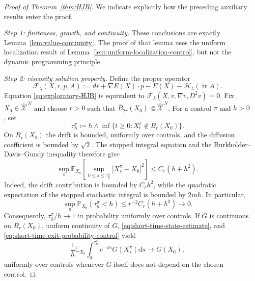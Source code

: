 \documentclass[11pt]{article}
\def\E{\mathbb{E}}
\def\P{\mathbb{P}}
\def\Fc{{\mathcal F}}
\def\Xc{{\mathcal X}}
\def\hX{\widehat{\Xc}^{\,N}}
\newcommand{\dd}{\mathrm{d}}
\newcommand{\tr}{\operatorname{tr}}
\theoremstyle{definition}
\theoremstyle{remark}
\numberwithin{equation}{section}
\begin{document}
\begin{proof}[Proof of Theorem~\ref{thm:HJB}]
We indicate explicitly how the preceding auxiliary results enter the proof.

\medskip
\noindent\textit{Step 1: finiteness, growth, and continuity.}
These conclusions are exactly Lemma~\ref{lem:value-continuity}.  The proof of that lemma uses the
uniform localization result of Lemma~\ref{lem:uniform-localization-control}, but not the dynamic
programming principle.

\medskip
\noindent\textit{Step 2: viscosity solution property.}
Define the proper operator
\begin{equation}\label{eq:proper-HJB-operator}
 \Fc_\lambda(X,r,p,A)
 :=\vartheta r+\nabla E(X)\cdot p-E(X)
 -\mathscr H_\lambda(\tr A).
\end{equation}
Equation \eqref{eq:exploratory-HJB} is equivalent to
$\Fc_\lambda(X,v,\nabla v,D^2v)=0$.
Fix $X_0\in\hX$ and choose $r>0$ such that
$\overline B_{2r}(X_0)\Subset\hX$.  For a control $\pi$ and $h>0$, set
\begin{equation}\label{eq:viscosity-exit-time-control}
 \tau_h^\pi
 :=h\wedge\inf\{t\ge0:X_t^\pi\notin B_r(X_0)\}.
\end{equation}
On $B_r(X_0)$ the drift is bounded, uniformly over controls, and the diffusion coefficient is
bounded by $\sqrt2$.  The stopped integral equation and the Burkholder--Davis--Gundy inequality
therefore give
\begin{equation}\label{eq:short-time-state-estimate}
 \sup_\pi\E_{X_0}\left[
 \sup_{0\le s\le\tau_h^\pi}|X_s^\pi-X_0|^2\right]
 \le C_r(h+h^2).
\end{equation}
Indeed, the drift contribution is bounded by $C_rh^2$, while the quadratic expectation of the
stopped stochastic integral is bounded by $2mh$.  In particular,
\begin{equation}\label{eq:short-time-exit-probability-control}
 \sup_\pi\P_{X_0}(\tau_h^\pi<h)
 \le r^{-2}C_r(h+h^2)\longrightarrow0.
\end{equation}
Consequently, $\tau_h^\pi/h\to1$ in probability uniformly over controls.  If $G$ is continuous on
$\overline B_r(X_0)$, uniform continuity of $G$, \eqref{eq:short-time-state-estimate}, and
\eqref{eq:short-time-exit-probability-control} yield
\begin{equation}\label{eq:short-time-average-control}
 \frac1h\E_{X_0}\int_0^{\tau_h^\pi}e^{-\vartheta s}G(X_s^\pi)\dd s
 \longrightarrow G(X_0),
\end{equation}
uniformly over controls whenever $G$ itself does not depend on the chosen control.

\end{proof}
\end{document}
